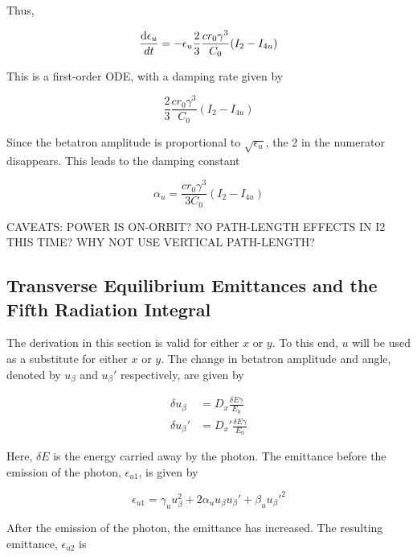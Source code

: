 Thus,

\begin{equation}
    \frac{\text{d} \epsilon_u}{dt} = - \epsilon_u \frac{2}{3} \frac{c r_0 \gamma^3}{C_0} (I_2 - I_{4u})
\end{equation}

This is a first-order ODE, with a damping rate given by

\begin{equation}
    \frac{2}{3} \frac{c r_0 \gamma^3}{C_0} (I_2 - I_{4u})
\end{equation}

Since the betatron amplitude is proportional to $\sqrt{\epsilon_u}$, the 2 in the numerator disappears. This leads to the damping constant

\begin{equation}
    \alpha_u = \frac{c r_0 \gamma^3}{3C_0} (I_2 - I_{4u})
\end{equation}

{\color{red} CAVEATS: POWER IS ON-ORBIT? NO PATH-LENGTH EFFECTS IN I2 THIS TIME? WHY NOT USE VERTICAL PATH-LENGTH?}

\subsection{Transverse Equilibrium Emittances and the Fifth Radiation Integral}
\label{sec:transverseeqemiti5}

The derivation in this section is valid for either $x$ or $y$. To this end, $u$ will be used as a substitute for either $x$ or $y$. The change in betatron amplitude and angle, denoted by $u_\beta$ and $u_\beta'$ respectively, are given by

\begin{align}
    \delta u_\beta  &= D_x  \frac{\delta E\gamma}{E_0}
    \label{eq:deltaubeta}\\
    \delta u_\beta' &= D_x' \frac{\delta E\gamma}{E_0}
    \label{eq:deltaubetaprime}
\end{align}

Here, $\delta E$ is the energy carried away by the photon. The emittance before the emission of the photon, $\epsilon_{u1}$, is given by

\begin{equation}
    \epsilon_{u1} = \gamma_u u_\beta^2 + 2 \alpha_u u_\beta u_\beta' + \beta_u u_\beta'^2
\end{equation}

After the emission of the photon, the emittance has increased. The resulting emittance, $\epsilon_{u2}$ is

